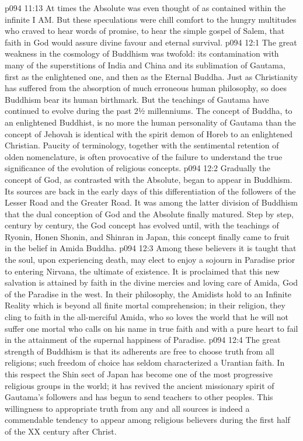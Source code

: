 \vs p094 11:13 At times the Absolute was even thought of as contained within the infinite I AM. But these speculations were chill comfort to the hungry multitudes who craved to hear words of promise, to hear the simple gospel of Salem, that faith in God would assure divine favour and eternal survival.
\vs p094 12:1 The great weakness in the cosmology of Buddhism was twofold: its contamination with many of the superstitions of India and China and its sublimation of Gautama, first as the enlightened one, and then as the Eternal Buddha. Just as Christianity has suffered from the absorption of much erroneous human philosophy, so does Buddhism bear its human birthmark. But the teachings of Gautama have continued to evolve during the past 2½ millenniums. The concept of Buddha, to an enlightened Buddhist, is no more the human personality of Gautama than the concept of Jehovah is identical with the spirit demon of Horeb to an enlightened Christian. Paucity of terminology, together with the sentimental retention of olden nomenclature, is often provocative of the failure to understand the true significance of the evolution of religious concepts.
\vs p094 12:2 \pc Gradually the concept of God, as contrasted with the Absolute, began to appear in Buddhism. Its sources are back in the early days of this differentiation of the followers of the Lesser Road and the Greater Road. It was among the latter division of Buddhism that the dual conception of God and the Absolute finally matured. Step by step, century by century, the God concept has evolved until, with the teachings of Ryonin, Honen Shonin, and Shinran in Japan, this concept finally came to fruit in the belief in Amida Buddha.
\vs p094 12:3 Among these believers it is taught that the soul, upon experiencing death, may elect to enjoy a sojourn in Paradise prior to entering Nirvana, the ultimate of existence. It is proclaimed that this new salvation is attained by faith in the divine mercies and loving care of Amida, God of the Paradise in the west. In their philosophy, the Amidists hold to an Infinite Reality which is beyond all finite mortal comprehension; in their religion, they cling to faith in the all\hyp{}merciful Amida, who so loves the world that he will not suffer one mortal who calls on his name in true faith and with a pure heart to fail in the attainment of the supernal happiness of Paradise.
\vs p094 12:4 The great strength of Buddhism is that its adherents are free to choose truth from all religions; such freedom of choice has seldom characterized a Urantian faith. In this respect the Shin sect of Japan has become one of the most progressive religious groups in the world; it has revived the ancient missionary spirit of Gautama’s followers and has begun to send teachers to other peoples. This willingness to appropriate truth from any and all sources is indeed a commendable tendency to appear among religious believers during the first half of the XX century after Christ.

